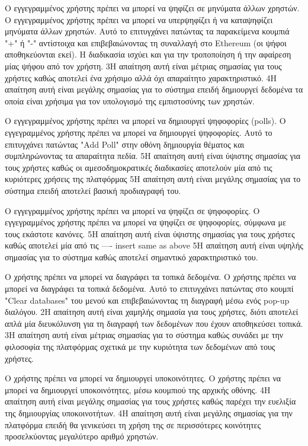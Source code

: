 \begin{enumerate}[label=\textbf{<ΛΑ-\arabic*>}, leftmargin=\parindent, align=left, labelwidth=\parindent, labelsep=0pt]
	\sysReqItem
		{\label{srs:functional-srs-vote-posts}}
		{Ο εγγεγραμμένος χρήστης πρέπει να μπορεί να ψηφίζει σε μηνύματα άλλων χρηστών.}
		{Ο εγγεγραμμένος χρήστης πρέπει να μπορεί να υπερψηφίζει ή να καταψηφίζει μηνύματα άλλων χρηστών. Αυτό το επιτυγχάνει πατώντας τα παρακείμενα κουμπιά "+" ή "-" αντίστοιχα και επιβεβαιώνοντας τη συναλλαγή στο Ethereum (οι ψήφοι αποθηκεύονται εκεί). Η διαδικασία ισχύει και για την τροποποίηση ή την αφαίρεση μίας ψήφου από τον χρήστη.}
		{3}{Η απαίτηση αυτή είναι μέτριας σημασίας για τους χρήστες καθώς αποτελεί ένα χρήσιμο αλλά όχι απαραίτητο χαρακτηριστικό.}
		{4}{Η απαίτηση αυτή είναι μεγάλης σημασίας για το σύστημα επειδή δημιουργεί δεδομένα τα οποία είναι χρήσιμα για τον υπολογισμό της εμπιστοσύνης των χρηστών.}

	\sysReqItem
		{\label{srs:functional-srs-create-polls}}
		{Ο εγγεγραμμένος χρήστης πρέπει να μπορεί να δημιουργεί ψηφοφορίες (polls).}
		{Ο εγγεγραμμένος χρήστης πρέπει να μπορεί να δημιουργεί ψηφοφορίες. Αυτό το επιτυγχάνει πατώντας "Add Poll" στην οθόνη δημιουργία θέματος και συμπληρώνοντας τα απαραίτητα πεδία.}
		{5}{Η απαίτηση αυτή είναι ύψιστης σημασίας για τους χρήστες καθώς οι αμεσοδημοκρατικές διαδικασίες αποτελούν μία από τις κυριότερες χρήσεις της πλατφόρμας}
		{5}{Η απαίτηση αυτή είναι μεγάλης σημασίας για το σύστημα επειδή αποτελεί βασική προδιαγραφή του.}

	\sysReqItem
		{\label{srs:functional-srs-vote-polls}}
		{Ο εγγεγραμμένος χρήστης πρέπει να μπορεί να ψηφίζει σε ψηφοφορίες.}
		{Ο εγγεγραμμένος χρήστης πρέπει να μπορεί να ψηφίζει σε ψηφοφορίες, σύμφωνα με τους εκάστοτε κανόνες.}
		{5}{Η απαίτηση αυτή είναι ύψιστης σημασίας για τους χρήστες καθώς αποτελεί μία από τις ---- insert same as above}
		{5}{Η απαίτηση αυτή είναι υψηλής σημασίας για το σύστημα καθώς αποτελεί σημαντικό χαρακτηριστικό του.}

	\sysReqItem
		{\label{srs:functional-srs-delete-local-data}}
		{Ο χρήστης πρέπει να μπορεί να διαγράφει τα τοπικά δεδομένα.}
		{Ο χρήστης πρέπει να μπορεί να διαγράφει τα τοπικά δεδομένα. Αυτό το επιτυγχάνει πατώντας στο κουμπί "Clear databases" του μενού και επιβεβαιώνοντας τη διαγραφή μέσω ενός pop-up διαλόγου.}
		{2}{Η απαίτηση αυτή είναι χαμηλής σημασία για τους χρήστες, διότι αποτελεί απλά μία διευκόλυνση για τη διαγραφή των δεδομένων που έχουν αποθηκεύσει τοπικά.}
		{3}{Η απαίτηση αυτή είναι μέτριας σημασίας για το σύστημα καθώς συνάδει με την φιλοσοφία της πλατφόρμας σχετικά με την κυριότητα των δεδομένων από τους χρήστες.}

	\sysReqItem
		{\label{srs:functional-srs-create-communities}}
		{Ο χρήστης πρέπει να μπορεί να δημιουργεί υποκοινότητες.}
		{Ο χρήστης πρέπει να μπορεί να δημιουργεί υποκοινότητες, μέσω κουμπιού της αρχικής οθόνης.}
		{4}{Η απαίτηση αυτή είναι μεγάλης σημασίας για τους χρήστες καθώς παρέχει την ευελιξία της δημιουργίας υποκοινοτήτων.}
		{4}{Η απαίτηση αυτή είναι μεγάλης σημασίας για την πλατφόρμα επειδή θα γενικεύσει τη χρήση της σε περισσότερες κοινότητες προσελκύοντας μεγαλύτερο αριθμό χρηστών.}


\end{enumerate}
